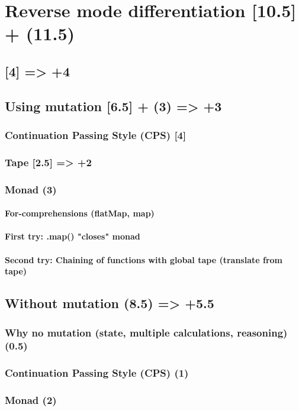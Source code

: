 \chapter{Reverse mode differentiation [10.5] + (11.5)}
	\section{[4] => +4}
	\section{Using mutation [6.5] + (3) => +3}
		\subsection{Continuation Passing Style (CPS) [4]}
		\subsection{Tape [2.5] => +2}
		\subsection{Monad (3)}
			\subsubsection{For-comprehensions (flatMap, map)}
			\subsubsection{First try: .map() "closes" monad}
			\subsubsection{Second try: Chaining of functions with global tape (translate from tape)}
	\section{Without mutation (8.5) => +5.5}
		\subsection{Why no mutation (state, multiple calculations, reasoning) (0.5)}
		\subsection{Continuation Passing Style (CPS) (1)}
		\subsection{Monad (2)}
